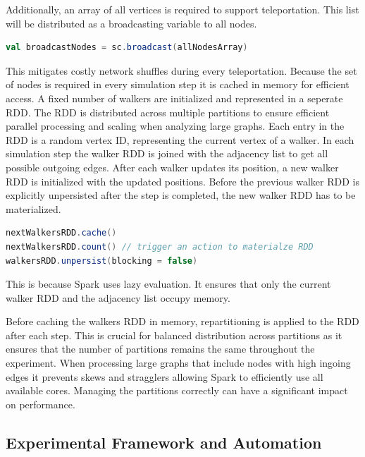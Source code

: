 Additionally, an array of all vertices is required to support teleportation. This list will be distributed as a broadcasting variable to all nodes.

\vspace{0.5em}
\begin{lstlisting}[language=Scala, caption={Broadcasting Variable}, label={lst:broadcast}]
val broadcastNodes = sc.broadcast(allNodesArray)
\end{lstlisting}
\vspace{0.5em}

This mitigates costly network shuffles during every teleportation. Because the set of nodes is required in every simulation step it is cached in memory for efficient access.
A fixed number of walkers are initialized and represented in a seperate RDD. The RDD is distributed across multiple partitions to ensure efficient parallel processing and scaling when analyzing large graphs. Each entry in the RDD is a random vertex ID, representing the current vertex of a walker. In each simulation step the walker RDD is joined with the adjacency list to get all possible outgoing edges. After each walker updates its position, a new walker RDD is initialized with the updated positions. Before the previous walker RDD is explicitly unpersisted after the step is completed, the new walker RDD has to be materialized.
\begin{lstlisting}[language=Scala, caption={Materializing and Unpersisting Walker RDD}, label={lst:materialize}]
nextWalkersRDD.cache() 
nextWalkersRDD.count() // trigger an action to materialze RDD
walkersRDD.unpersist(blocking = false)
\end{lstlisting}
\vspace{0.5em}
This is because Spark uses lazy evaluation. It ensures that only the current walker RDD and the adjacency list occupy memory. \par
Before caching the walkers RDD in memory, repartitioning is applied to the RDD after each step. This is crucial for balanced distribution across partitions as it ensures that the number of partitions remains the same throughout the experiment. 
When processing large graphs that include nodes with high ingoing edges it prevents skews and stragglers allowing Spark to efficiently use all available cores. Managing the partitions correctly can have a significant impact on performance. 


\subsection{Experimental Framework and Automation}

